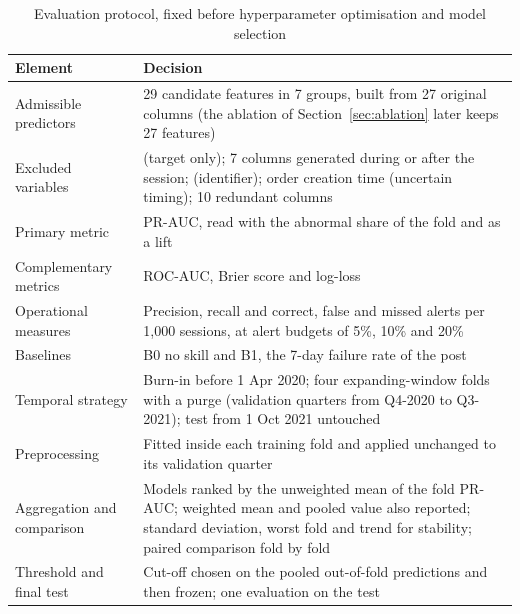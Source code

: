 \documentclass[12pt,a4paper,openany]{report}
\begin{document}
\begin{table}[!htb]
  \centering\small
  \caption{Evaluation protocol, fixed before hyperparameter optimisation and model selection}
  \label{tab:protocol}
  \begin{tabularx}{\textwidth}{>{\raggedright\arraybackslash}p{4.1cm}L}
    \toprule
    Element & Decision \\
    \midrule
    Admissible predictors & 29 candidate features in 7 groups, built from 27 original columns (the ablation of Section~\ref{sec:ablation} later keeps 27 features) \\
    \addlinespace[2pt]
    Excluded variables &  (target only); 7 columns generated during or after the session;  (identifier); order creation time (uncertain timing); 10 redundant columns \\
    \addlinespace[2pt]
    Primary metric & \acs{PR-AUC}, read with the abnormal share of the fold and as a lift \\
    Complementary metrics & \acs{ROC-AUC}, Brier score and log-loss \\
    \addlinespace[2pt]
    Operational measures & Precision, recall and correct, false and missed alerts per 1,000 sessions, at alert budgets of 5\%, 10\% and 20\% \\
    \addlinespace[2pt]
    Baselines & B0 no skill and B1, the 7-day failure rate of the post \\
    \addlinespace[2pt]
    Temporal strategy & Burn-in before 1 Apr 2020; four expanding-window folds with a purge (validation quarters from Q4-2020 to Q3-2021); test from 1 Oct 2021 untouched \\
    \addlinespace[2pt]
    Preprocessing & Fitted inside each training fold and applied unchanged to its validation quarter \\
    \addlinespace[2pt]
    Aggregation and comparison & Models ranked by the unweighted mean of the fold \acs{PR-AUC}; weighted mean and pooled value also reported; standard deviation, worst fold and trend for stability; paired comparison fold by fold \\
    \addlinespace[2pt]
    Threshold and final test & Cut-off chosen on the pooled out-of-fold predictions and then frozen; one evaluation on the test \\
    \bottomrule
  \end{tabularx}
\end{table}

\end{document}
